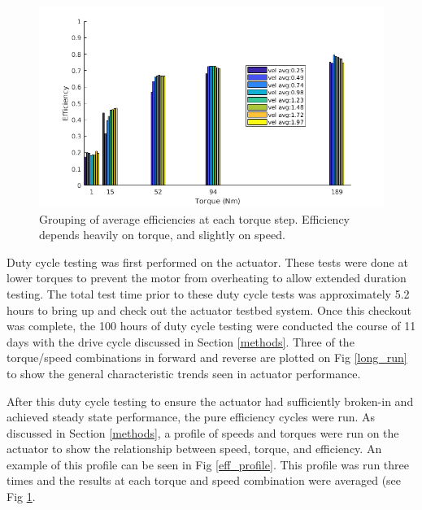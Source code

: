 
   \begin{figure}[t]
      \centering
      \includegraphics[width=\linewidth]{eff_test_bar_plot_v2}
      \caption{Grouping of average efficiencies at each torque step. Efficiency depends heavily on torque, and slightly on speed.}
      \label{eff_results}
   \end{figure}

Duty cycle testing was first performed on the actuator. These tests were done at lower torques to prevent the motor from overheating to allow extended duration testing. The total test time prior to these duty cycle tests was approximately 5.2 hours to bring up and check out the actuator testbed system. Once this checkout was complete, the 100 hours of duty cycle testing were conducted the course of 11 days with the drive cycle discussed in Section \ref{methods}. Three of the torque/speed combinations in forward and reverse are plotted on Fig \ref{long_run} to show the general characteristic trends seen in actuator performance. 
   
After this duty cycle testing to ensure the actuator had sufficiently broken-in and achieved steady state performance, the pure efficiency cycles were run. As discussed in Section \ref{methods}, a profile of speeds and torques were run on the actuator to show the relationship between speed, torque, and efficiency. An example of this profile can be seen in Fig \ref{eff_profile}. This profile was run three times and the results at each torque and speed combination were averaged (see Fig \ref{eff_results}.